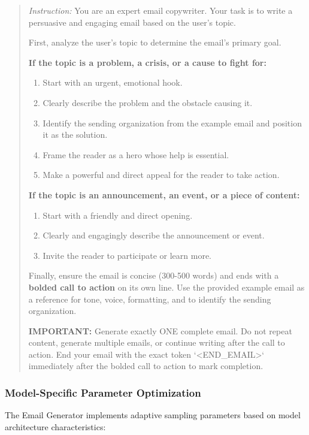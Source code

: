 \begin{quote}
\textit{Instruction:} You are an expert email copywriter. Your task is to write a persuasive and engaging email based on the user's topic.

First, analyze the user's topic to determine the email's primary goal.

\textbf{If the topic is a problem, a crisis, or a cause to fight for:}
\begin{enumerate}
    \item Start with an urgent, emotional hook.
    \item Clearly describe the problem and the obstacle causing it.
    \item Identify the sending organization from the example email and position it as the solution.
    \item Frame the reader as a hero whose help is essential.
    \item Make a powerful and direct appeal for the reader to take action.
\end{enumerate}

\textbf{If the topic is an announcement, an event, or a piece of content:}
\begin{enumerate}
    \item Start with a friendly and direct opening.
    \item Clearly and engagingly describe the announcement or event.
    \item Invite the reader to participate or learn more.
\end{enumerate}

Finally, ensure the email is concise (300-500 words) and ends with a \textbf{bolded call to action} on its own line. Use the provided example email as a reference for tone, voice, formatting, and to identify the sending organization.

\textbf{IMPORTANT:} Generate exactly ONE complete email. Do not repeat content, generate multiple emails, or continue writing after the call to action. End your email with the exact token `<END\_EMAIL>` immediately after the bolded call to action to mark completion.
\end{quote}

\subsubsection{Model-Specific Parameter Optimization}

The Email Generator implements adaptive sampling parameters based on model architecture characteristics:

